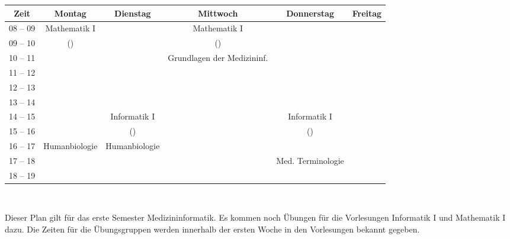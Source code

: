 \begin{minipage}{\textwidth}
    \footnotesize
\begin{center}
\begin{tabular}{|c|c|c|c|c|c|}
	\hline
	Zeit    & Montag       	& Dienstag    	& Mittwoch                  	& Donnerstag		& Freitag   \\\hline\hline
	08 – 09 & Mathematik I 	&             	& Mathematik I              	&			&			\\\cline{1-1}\cline{3-3}\cline{5-6}
	09 – 10 & (\Matheprof) 	&             	& (\Matheprof)              	&   			&			\\\hline
	10 – 11 &              	&             	& Grundlagen der Medizininf.	&			&			\\\cline{1-3}\cline{5-6}
	11 – 12 &              	&             	& 						       	&			&			\\\hline
	12 – 13 &              	&             	&                           	&			&			\\\hline
	13 – 14 &              	&             	&                           	&			&			\\\hline
	14 – 15 &              	& Informatik I	&                           	& Informatik I		&			\\\cline{1-2}\cline{4-4}\cline{6-6}
	15 – 16 &              	& (\Infoprof) 	&                           	& (\Infoprof)		&			\\\hline
	16 – 17 & Humanbiologie	& Humanbiologie &                           	&			&			\\\cline{1-1}\cline{4-6}
	17 – 18 &              	&             	&                           	& Med. Terminologie	&			\\\cline{1-4}\cline{6-6}
 	18 – 19 &              	&             	&                           	& 			&			\\\hline
\end{tabular}
    ~\\
\end{center}
\end{minipage}

Dieser Plan gilt für das erste Semester Medizininformatik. Es kommen noch Übungen für die Vorlesungen
Informatik I und Mathematik I dazu. Die Zeiten für die Übungsgruppen werden innerhalb der ersten Woche in den Vorlesungen bekannt gegeben. \\ \\
